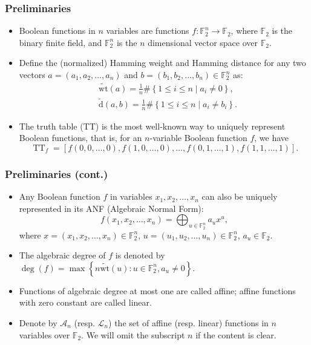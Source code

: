 \documentclass[
    aspectratio=169,                   %
]{beamer}
\newcommand{\F}{\mathbb{F}}
\newcommand{\dis}{\operatorname{\widetilde{d}}}
\newcommand{\wt}{\operatorname{\widetilde{wt}}}
\begin{document}
    \begin{frame}
        \frametitle{Preliminaries}
        
        \begin{itemize}
            \item Boolean functions in $n$ variables are functions $f:\F_2^n\rightarrow\F_2$, where $\F_2$ is the binary finite field, and $\F_2^n$ is the $n$ dimensional vector space over $\F_2$.
            \item Define the (normalized) Hamming weight and Hamming distance for any two vectors $a=(a_1,a_2,...,a_n)$ and $b=(b_1,b_2,...,b_n)\in\F_2^n$ as:
            \begin{align*}
                &\wt(a) =\frac{1}{n}\# \left\{ 1\le i\le n\mid a_i\ne 0 \right\},\\
                &\dis(a,b)=\frac{1}{n}\#\left\{ 1\le i\le n\mid a_i\ne b_i \right\}.
            \end{align*}
            \item The truth table (TT) is the most well-known way to uniquely represent Boolean functions, that is, for an $n$-variable Boolean function $f$, we have 
            \[\operatorname{TT}_f=\left[ f(0,0,\dots,0),f(1,0,\dots,0),\dots,f(0,1,\dots,1),f(1,1,\dots,1) \right].\]
            
        \end{itemize} 
    \end{frame}

    \begin{frame}
        \frametitle{Preliminaries (cont.)}
        \begin{itemize}
            \item Any Boolean function $f$ in variables $x_1,x_2,\dots,x_n$ can also be uniquely represented in its ANF (Algebraic Normal Form):
            \[f(x_1,x_2,\dots,x_n) = \bigoplus_{u\in\F_2^n}a_ux^u,\]
            where $x=(x_1,x_2,\dots,x_n)\in\F_2^n$, $u=(u_1,u_2,\dots,u_n)\in\F_2^n$, $a_u\in\F_2$.
            \item The algebraic degree of $f$ is denoted by $\operatorname{deg}(f)=\max\left\{ n\wt(u):u\in\F_2^n, a_u\ne 0 \right\}$.
            \item Functions of algebraic degree at most one are called affine; affine functions with zero constant are called linear. 
            \item Denote by $\mathcal{A}_n$ (resp. $\mathcal{L}_n$) the set of affine (resp. linear) functions in $n$ variables over $\F_2$. We will omit the subscript $n$ if the content is clear.
        \end{itemize}
        
    \end{frame}
    
\end{document}
